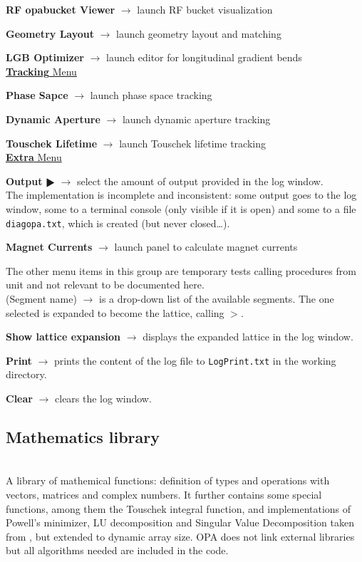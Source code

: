 \documentclass[12pt]{article}
\newcommand\code[1]{{\tt #1}}
\newcommand{\ofld}[1]{\colorbox{black!15}{{\bf #1}}}
\newcommand{\ofldx}[1]{\colorbox{black!15}{(#1)}}
\newcommand\guico[1]{{\color{blue}\code{#1}}}
\newcommand{\unico}[1]{{\color{burntorange}\code{#1}}}
\newcommand{\evcod}[2]{\ofld{#1} $\rightarrow$ \guico{#2}}
\newcommand{\evcodx}[2]{\ofldx{#1} $\rightarrow$ \guico{#2}}
\newcommand{\prcod}[2]{\opauni{#1}$>$\unico{#2}}
\newcommand{\opagui}[1]{\colorbox{blue!20}{{\color{black}\code{#1}}}}
\newcommand{\ogui}[1]{\hyperref[#1]{\opagui{#1}}}
\newcommand{\opauni}[1]{\colorbox{orange!30}{{\color{black}\code{#1}}}}
\newcommand{\ounih}[2]{\subsection{\label{#2}#1}{\Huge\opauni{#2}}\\}
\newcommand{\ouni}[1]{\hyperref[#1]{\opauni{#1}}}
\newcommand{\desc}[1]{#1}
\newcommand{\todo}[1]{{\color{red} #1}}
\begin{document}
{\evcod{RF opabucket Viewer}{ds\_rfbu} launch RF bucket visualization \ogui{opabucket}

\evcod{Geometry Layout}{ds\_geo } launch geometry layout and matching \ogui{opageometry}

\evcod{LGB Optimizer}{ds\_lgbo } launch editor for longitudinal gradient bends \ogui{opalgbedit}\\


\underline{\ofld{Tracking} Menu}

\evcod{Phase Sapce}{tr\_phsp} launch phase space tracking \ogui{opatrackps}

\evcod{Dynamic Aperture}{tr\_dyna} launch dynamic aperture tracking \ogui{opatrackda}

\evcod{Touschek Lifetime}{tr\_ttau} launch Touschek lifetime tracking \ogui{opatracktt}\\

\underline{\ofld{Extra} Menu}

\evcod{Output $\RHD$}{tm\_di} select the amount of output provided in the log window.\\ \todo{The implementation is incomplete and inconsistent: some output goes to the log window, some to a terminal console (only visible if it is open) and some to a file \code{diagopa.txt}, which is created (but never closed\dots).}

\evcod{Magnet Currents}{tm\_cur} launch panel to calculate magnet currents \ogui{opacurrents}

The other menu items in this group are temporary tests calling procedures from unit \ouni{testcode} and not relevant to be documented here.\\

\evcodx{Segment name}{ComboSeg} is a drop-down list of the available segments. The one selected is expanded to become the lattice, calling \prcod{globlib}{MakeLattice}.

\evcod{Show lattice expansion}{butlatsh} displays the expanded lattice in the log window.

\evcod{Print}{ButLogPrt} prints the content of the log file to \code{LogPrint.txt} in the working directory.

\evcod{Clear}{ButLogClr} clears the log window.
}


\ounih{Mathematics library}{mathlib}

\desc{
A library of mathemical functions: definition of types and operations with vectors, matrices and complex numbers. It further contains some special functions, among them the Touschek integral function, and implementations of Powell's minimizer, LU decomposition and Singular Value Decomposition taken from \cite{numrec}, but extended to dynamic array size. OPA does not link external libraries but all algorithms needed are included in the code.}
\end{document}
